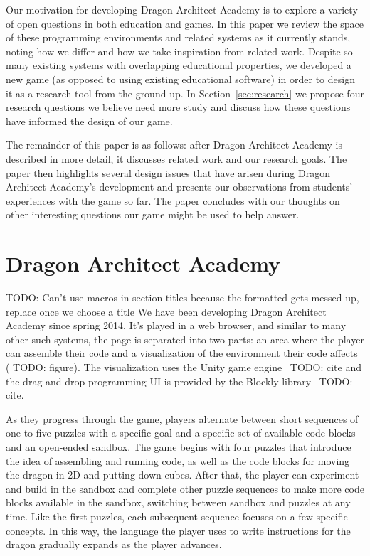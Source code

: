 \documentclass{sig-alternate}
\newcommand{\TODO}[1]{{\color{red} TODO: #1}}
\newcommand{\gametitle}{{\color{RoyalPurple} Dragon Architect Academy}}
\begin{document}
Our motivation for developing \gametitle{} is to explore a variety of open questions in both education and games. 
In this paper we review the space of these programming environments and related systems as it currently stands, noting how we differ and how we take inspiration from related work.  
Despite so many existing systems with overlapping educational properties, we developed a new game (as opposed to using existing educational software) in order to design it as a research tool from the ground up.
In Section~\ref{sec:research} we propose four research questions we believe need more study and discuss how these questions have informed the design of our game. 

The remainder of this paper is as follows: after \gametitle{} is described in more detail, it discusses related work and our research goals. 
The paper then highlights several design issues that have arisen during \gametitle{}'s development and presents our observations from students' experiences with the game so far. 
The paper concludes with our thoughts on other interesting questions our game might be used to help answer.

\section{\gametitle{}}
\TODO{Can't use macros in section titles because the formatted gets messed up, replace once we choose a title}
We have been developing \gametitle{} since spring 2014. 
It's played in a web browser, and similar to many other such systems, the page is separated into two parts: an area where the player can assemble their code and a visualization of the environment their code affects (\TODO{figure}). 
The visualization uses the Unity game engine~\TODO{cite} and the drag-and-drop programming UI is provided by the Blockly library~\TODO{cite}.

As they progress through the game, players alternate between short sequences of one to five puzzles with a specific goal and a specific set of available code blocks and an open-ended sandbox. 
The game begins with four puzzles that introduce the idea of assembling and running code, as well as the code blocks for moving the dragon in 2D and putting down cubes.
After that, the player can experiment and build in the sandbox and complete other puzzle sequences to make more code blocks available in the sandbox, switching between sandbox and puzzles at any time. 
Like the first puzzles, each subsequent sequence focuses on a few specific concepts. 
In this way, the language the player uses to write instructions for the dragon gradually expands as the player advances.
\end{document}
